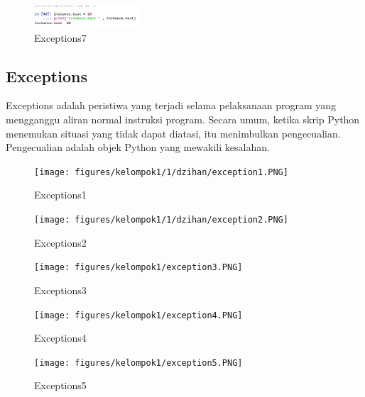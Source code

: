 \hfill\break
	\begin{figure}[H]
		\centering
		\includegraphics[width=4cm]{figures/kelompok1/1/dzihan/class7.PNG}
		\caption{Exceptions7}
	\end{figure}
\subsection{Exceptions}
Exceptions adalah peristiwa yang terjadi selama pelaksanaan program yang mengganggu aliran normal instruksi program. Secara umum, ketika skrip Python menemukan situasi yang tidak dapat diatasi, itu menimbulkan pengecualian. Pengecualian adalah objek Python yang mewakili kesalahan.
\hfill\break

\hfill\break
	\begin{figure}[H]
		\centering
		\texttt{[image: figures/kelompok1/1/dzihan/exception1.PNG]}
		\caption{Exceptions1}
	\end{figure}
\hfill\break

\hfill\break
	\begin{figure}[H]
		\centering
		\texttt{[image: figures/kelompok1/1/dzihan/exception2.PNG]}
		\caption{Exceptions2}
	\end{figure}
\hfill\break

\hfill\break
	\begin{figure}[H]
		\centering
		\texttt{[image: figures/kelompok1/exception3.PNG]}
		\caption{Exceptions3}
	\end{figure}
\hfill\break

\hfill\break
	\begin{figure}[H]
		\centering
		\texttt{[image: figures/kelompok1/exception4.PNG]}
		\caption{Exceptions4}
	\end{figure}
\hfill\break

\hfill\break
	\begin{figure}[H]
		\centering
		\texttt{[image: figures/kelompok1/exception5.PNG]}
		\caption{Exceptions5}
	\end{figure}